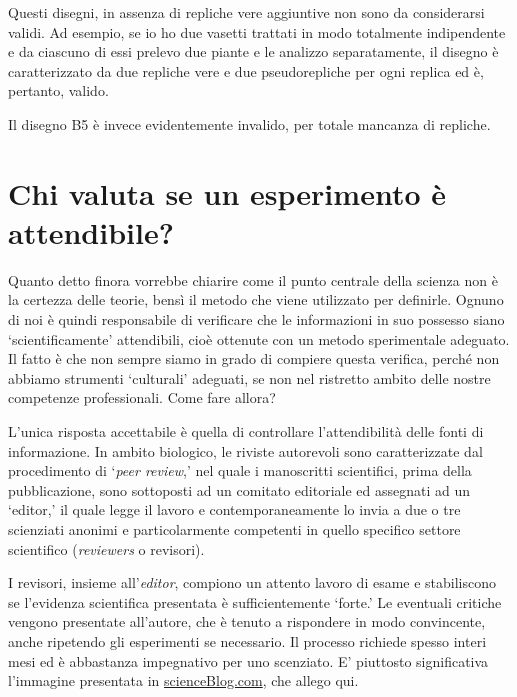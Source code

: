 \documentclass[a4paper,12pt,oneside]{book}
\begin{document}
Questi disegni, in assenza di repliche vere aggiuntive non sono da considerarsi validi. Ad esempio, se io ho due vasetti trattati in modo totalmente indipendente e da ciascuno di essi prelevo due piante e le analizzo separatamente, il disegno è caratterizzato da due repliche vere e due pseudorepliche per ogni replica ed è, pertanto, valido.

Il disegno B5 è invece evidentemente invalido, per totale mancanza di repliche.

\hypertarget{chi-valuta-se-un-esperimento-uxe8-attendibile}{%
\section{Chi valuta se un esperimento è attendibile?}\label{chi-valuta-se-un-esperimento-uxe8-attendibile}}

Quanto detto finora vorrebbe chiarire come il punto centrale della scienza non è la certezza delle teorie, bensì il metodo che viene utilizzato per definirle. Ognuno di noi è quindi responsabile di verificare che le informazioni in suo possesso siano `scientificamente' attendibili, cioè ottenute con un metodo sperimentale adeguato. Il fatto è che non sempre siamo in grado di compiere questa verifica, perché non abbiamo strumenti `culturali' adeguati, se non nel ristretto ambito delle nostre competenze professionali. Come fare allora?

L'unica risposta accettabile è quella di controllare l'attendibilità delle fonti di informazione. In ambito biologico, le riviste autorevoli sono caratterizzate dal procedimento di `\emph{peer review},' nel quale i manoscritti scientifici, prima della pubblicazione, sono sottoposti ad un comitato editoriale ed assegnati ad un `editor,' il quale legge il lavoro e contemporaneamente lo invia a due o tre scienziati anonimi e particolarmente competenti in quello specifico settore scientifico (\emph{reviewers} o revisori).

I revisori, insieme all'\emph{editor}, compiono un attento lavoro di esame e stabiliscono se l'evidenza scientifica presentata è sufficientemente `forte.' Le eventuali critiche vengono presentate all'autore, che è tenuto a rispondere in modo convincente, anche ripetendo gli esperimenti se necessario. Il processo richiede spesso interi mesi ed è abbastanza impegnativo per uno scenziato. E' piuttosto significativa l'immagine presentata in \href{http://scienceblogs.com/startswithabang/2013/06/07/the-4-jobs-of-a-referee-in-peer-review/}{scienceBlog.com}, che allego qui.
\end{document}

